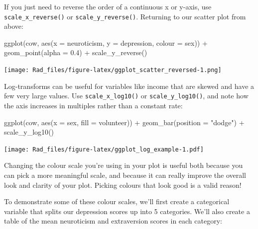 \documentclass[
]{book}
\newenvironment{Shaded}{\begin{snugshade}}{\end{snugshade}}
\newcommand{\AttributeTok}[1]{\textcolor[rgb]{0.77,0.63,0.00}{#1}}
\newcommand{\FloatTok}[1]{\textcolor[rgb]{0.00,0.00,0.81}{#1}}
\newcommand{\FunctionTok}[1]{\textcolor[rgb]{0.00,0.00,0.00}{#1}}
\newcommand{\NormalTok}[1]{#1}
\newcommand{\SpecialCharTok}[1]{\textcolor[rgb]{0.00,0.00,0.00}{#1}}
\newcommand{\StringTok}[1]{\textcolor[rgb]{0.31,0.60,0.02}{#1}}
\begin{document}
If you just need to reverse the order of a continuous x or y-axis, use
\texttt{scale\_x\_reverse()} or \texttt{scale\_y\_reverse()}. Returning to our
scatter plot from above:

\begin{Shaded}
\begin{Highlighting}[]
\FunctionTok{ggplot}\NormalTok{(cow, }
       \FunctionTok{aes}\NormalTok{(}\AttributeTok{x =}\NormalTok{ neuroticism, }\AttributeTok{y =}\NormalTok{ depression, }\AttributeTok{colour =}\NormalTok{ sex)) }\SpecialCharTok{+}
    \FunctionTok{geom\_point}\NormalTok{(}\AttributeTok{alpha =} \FloatTok{0.4}\NormalTok{) }\SpecialCharTok{+}
    \FunctionTok{scale\_y\_reverse}\NormalTok{()}
\end{Highlighting}
\end{Shaded}

\texttt{[image: Rad\_files/figure-latex/ggplot\_scatter\_reversed-1.png]}

Log-transforms can be useful for variables like income that are skewed
and have a few very large values. Use \texttt{scale\_x\_log10()} or \texttt{scale\_y\_log10()},
and note how the axis increases in multiples rather than a constant rate:

\begin{Shaded}
\begin{Highlighting}[]
\FunctionTok{ggplot}\NormalTok{(cow, }\FunctionTok{aes}\NormalTok{(}\AttributeTok{x =}\NormalTok{ sex, }\AttributeTok{fill =}\NormalTok{ volunteer)) }\SpecialCharTok{+}
    \FunctionTok{geom\_bar}\NormalTok{(}\AttributeTok{position =} \StringTok{"dodge"}\NormalTok{) }\SpecialCharTok{+}
    \FunctionTok{scale\_y\_log10}\NormalTok{()}
\end{Highlighting}
\end{Shaded}

\texttt{[image: Rad\_files/figure-latex/ggplot\_log\_example-1.pdf]}

Changing the colour scale you're using in your plot is useful both
because you can pick a more meaningful scale, and because it can
really improve the overall look and clarity of your plot. Picking
colours that look good is a valid reason!

To demonstrate some of these colour scales, we'll first create
a categorical variable that splits our depression scores up into
5 categories. We'll also create a table of the mean neuroticism
and extraversion scores in each category:
\end{document}
